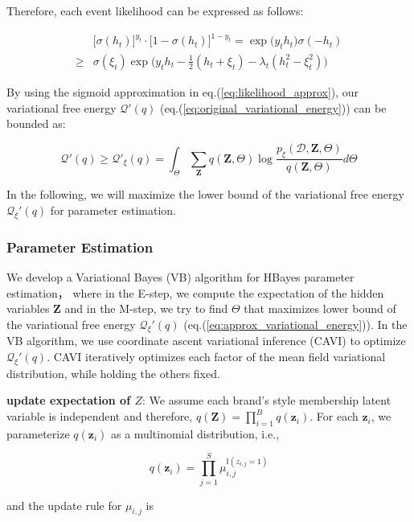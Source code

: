 Therefore, each event likelihood can be expressed as follows:

\begin{align}
\label{eq:likelihood_approx}
& \big[\sigma(h_t)\big]^{y_t} \cdot  \big[1-\sigma(h_t) \big]^{1-y_t} = \exp\big( y_t h_t \big) \sigma(-h_t) \nonumber \\
\geq & \sigma(\xi_t)\exp \big(y_t h_t-\frac{1}{2}(h_t+\xi_t)-\lambda_t(h_t^2-\xi_t^2) \big)
\end{align}

By using the sigmoid approximation in eq.(\ref{eq:likelihood_approx}), our variational free energy $\mathcal{Q}'(q)$ (eq.(\ref{eq:original_variational_energy})) can be bounded as:

\begin{equation}
\label{eq:approx_variational_energy}
\mathcal{Q}'(q) \geq \mathcal{Q}'_{\xi}(q) = \int_\Theta \sum_{\bm{Z}} q(\bm{Z},\Theta) \log\frac{p_{\xi}(\mathcal{D},\bm{Z},\Theta)}{q(\bm{Z},\Theta)}d\Theta
\end{equation}

In the following, we will maximize the lower bound of the variational free energy $\mathcal{Q}_{\xi}'(q) $ for parameter estimation.

\subsubsection{Parameter Estimation}
\label{sec:param}

We develop a Variational Bayes (VB) algorithm for HBayes parameter estimation， where in the E-step, we compute the expectation of the hidden variables $\mathbf{Z}$ and in the M-step, we try to find $\Theta$ that maximizes lower bound of the variational free energy $\mathcal{Q}_{\xi}'(q)$ (eq.(\ref{eq:approx_variational_energy})). In the VB algorithm, we use coordinate ascent variational inference (CAVI) \cite{bishop2006pattern} to optimize $\mathcal{Q}_{\xi}'(q)$. CAVI iteratively optimizes each factor of the mean field variational distribution, while holding the others fixed.

\noindent \textbf{update expectation of $Z$}:
We assume each brand's style membership latent variable is independent and therefore, $q(\mathbf{Z}) = \prod_{i=1}^B q(\mathbf{z}_i)$. For each $\mathbf{z}_i$, we parameterize $q(\mathbf{z}_i)$ as a multinomial distribution, i.e.,

$$q(\mathbf{z}_i) = \prod_{j=1}^S \mu_{i,j}^{\mathbb{I}(z_{i,j}=1)}$$

and the update rule for $\mu_{i,j}$ is  

